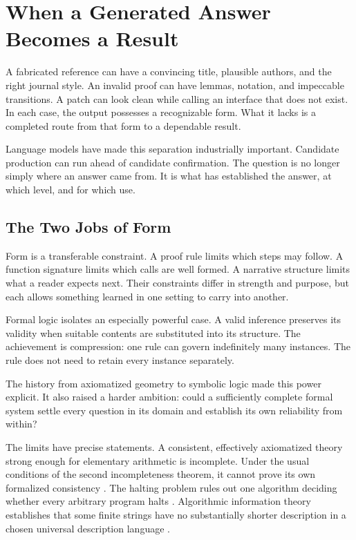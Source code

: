 \section{When a Generated Answer Becomes a Result}

A fabricated reference can have a convincing title, plausible authors, and the right journal style. An invalid proof can have lemmas, notation, and impeccable transitions. A patch can look clean while calling an interface that does not exist. In each case, the output possesses a recognizable form. What it lacks is a completed route from that form to a dependable result.

Language models have made this separation industrially important. Candidate production can run ahead of candidate confirmation. The question is no longer simply where an answer came from. It is what has established the answer, at which level, and for which use.

\subsection{The Two Jobs of Form}

Form is a transferable constraint. A proof rule limits which steps may follow. A function signature limits which calls are well formed. A narrative structure limits what a reader expects next. Their constraints differ in strength and purpose, but each allows something learned in one setting to carry into another.

Formal logic isolates an especially powerful case. A valid inference preserves its validity when suitable contents are substituted into its structure. The achievement is compression: one rule can govern indefinitely many instances. The rule does not need to retain every instance separately.

The history from axiomatized geometry to symbolic logic made this power explicit. It also raised a harder ambition: could a sufficiently complete formal system settle every question in its domain and establish its own reliability from within?

The limits have precise statements. A consistent, effectively axiomatized theory strong enough for elementary arithmetic is incomplete. Under the usual conditions of the second incompleteness theorem, it cannot prove its own formalized consistency \cite{godel1931}. The halting problem rules out one algorithm deciding whether every arbitrary program halts \cite{turing1936}. Algorithmic information theory establishes that some finite strings have no substantially shorter description in a chosen universal description language \cite{chaitin1987}.

